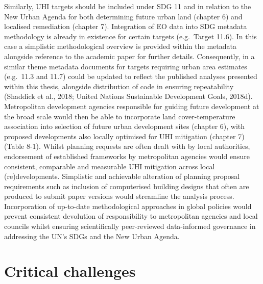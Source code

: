 \documentclass[]{book}
\begin{document}
Similarly, UHI targets should be included under SDG 11 and in relation
to the New Urban Agenda for both determining future urban land (chapter
6) and localised remediation (chapter 7). Integration of EO data into
SDG metadata methodology is already in existence for certain targets
(e.g.~Target 11.6). In this case a simplistic methodological overview is
provided within the metadata alongside reference to the academic paper
for further details. Consequently, in a similar theme metadata documents
for targets requiring urban area estimates (e.g.~11.3 and 11.7) could be
updated to reflect the published analyses presented within this thesis,
alongside distribution of code in ensuring repeatability (Shaddick et
al., 2018; United Nations Sustainable Development Goals, 2018d).
Metropolitan development agencies responsible for guiding future
development at the broad scale would then be able to incorporate land
cover-temperature association into selection of future urban development
sites (chapter 6), with proposed developments also locally optimised for
UHI mitigation (chapter 7) (Table 8-1). Whilst planning requests are
often dealt with by local authorities, endorsement of established
frameworks by metropolitan agencies would ensure consistent, comparable
and measurable UHI mitigation across local (re)developments. Simplistic
and achievable alteration of planning proposal requirements such as
inclusion of computerised building designs that often are produced to
submit paper versions would streamline the analysis process.
Incorporation of up-to-date methodological approaches in global policies
would prevent consistent devolution of responsibility to metropolitan
agencies and local councils whilst ensuring scientifically peer-reviewed
data-informed governance in addressing the UN's SDGs and the New Urban
Agenda.

\section{Critical challenges}\label{critical-challenges}
\end{document}
